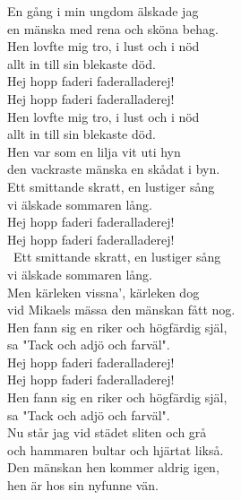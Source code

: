\documentclass[a6paper,10pt]{article}
\begin{document}
En gång i min ungdom älskade jag\\
en mänska med rena och sköna behag.\\
Hen lovfte mig tro, i lust och i nöd\\
allt in till sin blekaste död.
\vspace{5pt}\\
Hej hopp faderi faderalladerej!\\
Hej hopp faderi faderalladerej!\\
Hen lovfte mig tro, i lust och i nöd\\
allt in till sin blekaste död.
\vspace{5pt}\\
Hen var som en lilja vit uti hyn\\
den vackraste mänska en skådat i byn.\\
Ett smittande skratt, en lustiger sång\\
vi älskade sommaren lång.
\vspace{5pt}\\
Hej hopp faderi faderalladerej!\\
Hej hopp faderi faderalladerej!\\\
Ett smittande skratt, en lustiger sång\\
vi älskade sommaren lång.
\vspace{5pt}\\
Men kärleken vissna', kärleken dog\\
vid Mikaels mässa den mänskan fått nog.\\
Hen fann sig en riker och högfärdig själ,\\
sa "Tack och adjö och farväl".
\vspace{5pt}\\
Hej hopp faderi faderalladerej!\\
Hej hopp faderi faderalladerej!\\
Hen fann sig en riker och högfärdig själ,\\
sa "Tack och adjö och farväl".
\vspace{5pt}\\
Nu står jag vid städet sliten och grå\\
och hammaren bultar och hjärtat likså.\\
Den mänskan hen kommer aldrig igen,\\
hen är hos sin nyfunne vän.
\end{document}
